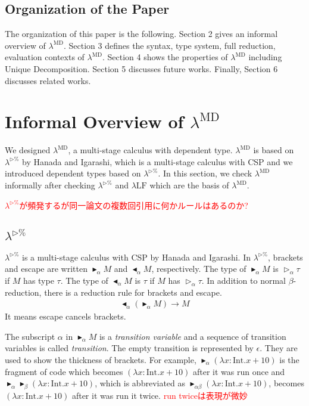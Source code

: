 \documentclass[runningheads]{llncs}
\newcommand{\red}[1]{\textcolor{red}{#1 }}
\newcommand{\LTP}{$\lambda^{\triangleright\%}$\xspace}
\newcommand{\LMD}{$\lambda^{\textrm{MD}}$\xspace}
\newcommand{\LLF}{$\lambda\textrm{LF}$\xspace}
\newcommand{\TW}{\triangleright}
\newcommand{\TB}{\blacktriangleright}
\newcommand{\TBL}{\blacktriangleleft}
\newcommand{\I}{\textrm{Int}}
\begin{document}
\subsection{Organization of the Paper}

The organization of this paper is the following.
Section 2 gives an informal overview of \LMD.
Section 3 defines the syntax, type system, full reduction, evaluation contexts of \LMD.
Section 4 shows the properties of \LMD including Unique Decomposition.
Section 5 discusses future works.
Finally, Section 6 discusses related works.

\section{Informal Overview of \LMD}

We designed \LMD, a multi-stage calculus with dependent type.
\LMD is based on \LTP\cite{Hanada2014} by Hanada and Igarashi, which is a multi-stage calculus with CSP and
we introduced dependent types based on \LTP\cite{attapl}.
In this section, we check \LMD informally after checking \LTP and \LLF which are the basis of \LMD.

\red{\LTP\cite{Hanada2014}が頻発するが同一論文の複数回引用に何かルールはあるのか?}
\subsection{\LTP}


\LTP\cite{Hanada2014} is a multi-stage calculus with CSP by Hanada and Igarashi.
In \LTP, brackets and escape are written $\TB_\alpha M$ and $\TBL_\alpha M$, respectively.
The type of $\TB_\alpha M$ is $\TW_\alpha \tau$ if $M$ has type $\tau$.
The type of $\TBL_\alpha M$ is $\tau$ if $M$ has $\TW_\alpha \tau$.
In addition to normal $\beta$-reduction, there is a reduction rule for brackets and escape.
\begin{align*}
    \TBL_\alpha (\TB_\alpha M) \longrightarrow M
\end{align*}
It means escape cancels brackets.


The subscript $\alpha$ in $\TB_\alpha M$ is a \textit{transition variable} and
a sequence of transition variables is called \textit{transition}.
The empty transition is represented by $\epsilon$.
They are used to show the thickness of brackets.
For example, $\TB_\alpha (\lambda x:\I.x+10)$ is the fragment of code which becomes $(\lambda x:\I.x+10)$ after it was run once and
$\TB_\alpha \TB_\beta (\lambda x:\I.x+10)$, which is abbreviated as $\TB_{\alpha\beta} (\lambda x:\I.x+10)$,
 becomes $(\lambda x:\I.x+10)$ after it was run it twice.
\red{run twiceは表現が微妙}
\end{document}
